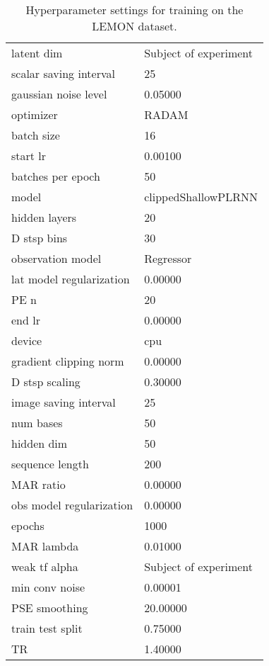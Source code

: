 \begin{table}
\centering
\caption{Hyperparameter settings for training on the LEMON dataset.}
\label{tab:args lemon runs}
\begin{tabular}{ll}
\toprule
\midrule
latent dim & Subject of experiment \\
scalar saving interval & 25 \\
gaussian noise level & 0.05000 \\
optimizer & RADAM \\
batch size & 16 \\
start lr & 0.00100 \\
batches per epoch & 50 \\
model & clippedShallowPLRNN \\
hidden layers & 20 \\
D stsp bins & 30 \\
observation model & Regressor \\
lat model regularization & 0.00000 \\
PE n & 20 \\
end lr & 0.00000 \\
device & cpu \\
gradient clipping norm & 0.00000 \\
D stsp scaling & 0.30000 \\
image saving interval & 25 \\
num bases & 50 \\
hidden dim & 50 \\
sequence length & 200 \\
MAR ratio & 0.00000 \\
obs model regularization & 0.00000 \\
epochs & 1000 \\
MAR lambda & 0.01000 \\
weak tf alpha & Subject of experiment \\
min conv noise & 0.00001 \\
PSE smoothing & 20.00000 \\
train test split & 0.75000 \\
TR & 1.40000 \\
\bottomrule
\end{tabular}
\end{table}
